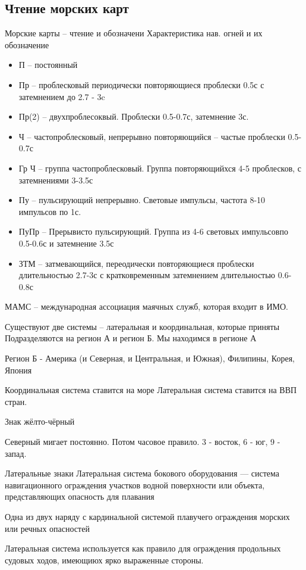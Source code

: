 \documentclass{article}        %
\begin{document}
\begin{description}
\subsection{Чтение морских карт}
Морские карты -- чтение и обозначени
Характеристика нав. огней и их обозначение

\begin{itemize}
\item П -- постоянный
\item Пр -- проблесковый периодически повторяющиеся проблески 0.5с с затемнением до 2.7 - 3c
\item Пр(2) -- двухпроблесоквый. Проблески 0.5-0.7с, затемнение 3с.
\item Ч -- частопроблесковый, непрерывно повторяющийся -- частые проблески 0.5-0.7с
\item Гр Ч -- группа частопроблесковый. Группа повторяющийхся 4-5 проблесков, с затемнениями 3-3.5с
\item Пу -- пульсирующий непрерывно. Световые импульсы, частота 8-10 импульсов по 1с.
\item ПуПр -- Прерывисто пульсирующий. Группа из 4-6 световых импульсовпо 0.5-0.6с и затемнение 3.5с
\item ЗТМ -- затмевающийся, переодически повторяющиеся проблески длительностью 2.7-3с с кратковременным затемнением длительностью 0.6-0.8с

\end{itemize}
МАМС -- международная ассоциация маячных служб, которая входит в ИМО.

Существуют две системы -- латеральная и координальная, которые приняты
Подразделяются на регион А и регион Б. Мы находимся в регионе А

Регион Б - Америка (и Северная, и Центральная, и Южная), Филипины, Корея, Япония

Координальная система ставится на море
Латеральная система ставится на ВВП стран. 

Знак жёлто-чёрный

Северный мигает постоянно.
Потом часовое правило. 3 - восток, 6 - юг, 9 - запад.

Латеральные знаки
Латеральная система бокового оборудования --- система навигационного 
ограждения участков водной поверхности или объекта, представляющих опасность 
для плавания

Одна из двух наряду с кардинальной системой плавучего ограждения морских или речных опасностей

Латеральная система используется как правило для ограждения 
продольных судовых ходов, имеющиюх ярко выраженные стороны.


\end{description}
\end{document}

